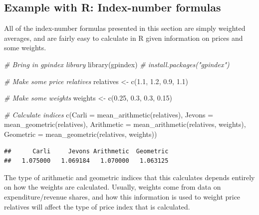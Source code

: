 \documentclass[
]{article}
\newenvironment{Shaded}{\begin{snugshade}}{\end{snugshade}}
\newcommand{\AttributeTok}[1]{\textcolor[rgb]{0.77,0.63,0.00}{#1}}
\newcommand{\CommentTok}[1]{\textcolor[rgb]{0.56,0.35,0.01}{\textit{#1}}}
\newcommand{\FloatTok}[1]{\textcolor[rgb]{0.00,0.00,0.81}{#1}}
\newcommand{\FunctionTok}[1]{\textcolor[rgb]{0.00,0.00,0.00}{#1}}
\newcommand{\NormalTok}[1]{#1}
\newcommand{\OtherTok}[1]{\textcolor[rgb]{0.56,0.35,0.01}{#1}}
\begin{document}
\hypertarget{example-with-r-index-number-formulas}{%
\subsection{Example with R: Index-number formulas}\label{example-with-r-index-number-formulas}}

All of the index-number formulas presented in this section are simply weighted averages, and are fairly easy to calculate in R given information on prices and some weights.

\begin{Shaded}
\begin{Highlighting}[]
\CommentTok{\# Bring in gpindex library}
\FunctionTok{library}\NormalTok{(gpindex) }\CommentTok{\# install.packages("gpindex")}

\CommentTok{\# Make some price relatives}
\NormalTok{relatives }\OtherTok{\textless{}{-}} \FunctionTok{c}\NormalTok{(}\FloatTok{1.1}\NormalTok{, }\FloatTok{1.2}\NormalTok{, }\FloatTok{0.9}\NormalTok{, }\FloatTok{1.1}\NormalTok{)}

\CommentTok{\# Make some weights}
\NormalTok{weights }\OtherTok{\textless{}{-}} \FunctionTok{c}\NormalTok{(}\FloatTok{0.25}\NormalTok{, }\FloatTok{0.3}\NormalTok{, }\FloatTok{0.3}\NormalTok{, }\FloatTok{0.15}\NormalTok{)}

\CommentTok{\# Calculate indices}
\FunctionTok{c}\NormalTok{(}\AttributeTok{Carli =} \FunctionTok{mean\_arithmetic}\NormalTok{(relatives), }
  \AttributeTok{Jevons =} \FunctionTok{mean\_geometric}\NormalTok{(relatives), }
  \AttributeTok{Arithmetic =} \FunctionTok{mean\_arithmetic}\NormalTok{(relatives, weights),}
  \AttributeTok{Geometric =} \FunctionTok{mean\_geometric}\NormalTok{(relatives, weights))}
\end{Highlighting}
\end{Shaded}

\begin{verbatim}
##      Carli     Jevons Arithmetic  Geometric 
##   1.075000   1.069184   1.070000   1.063125
\end{verbatim}

The type of arithmetic and geometric indices that this calculates depends entirely on how the weights are calculated. Usually, weights come from data on expenditure/revenue shares, and how this information is used to weight price relatives will affect the type of price index that is calculated.
\end{document}
